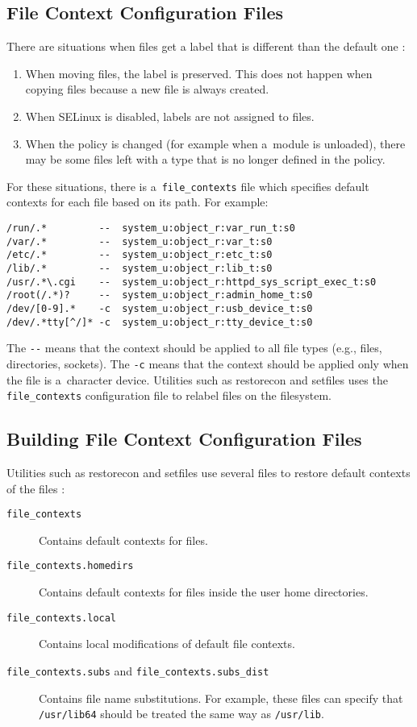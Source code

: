 \subsection{File Context Configuration Files}
There are situations when files get a label that is different than the default
one \cite{selinuxguide}:
\begin{enumerate}
    \item When moving files, the label is preserved. This does not happen when
        copying files because a new file is always created.
    \item When SELinux is disabled, labels are not assigned to files.
    \item When the policy is changed (for example when a~module is unloaded),
        there may be some files left with a type that is no longer defined in
        the policy.
\end{enumerate}
For these situations, there is a~\texttt{file\_contexts} file which specifies
default contexts for each file based on its path. For example:
\begin{lstlisting}
/run/.*         --  system_u:object_r:var_run_t:s0
/var/.*	        --  system_u:object_r:var_t:s0
/etc/.*	        --  system_u:object_r:etc_t:s0
/lib/.*	        --  system_u:object_r:lib_t:s0
/usr/.*\.cgi    --  system_u:object_r:httpd_sys_script_exec_t:s0
/root(/.*)?     --  system_u:object_r:admin_home_t:s0
/dev/[0-9].*    -c  system_u:object_r:usb_device_t:s0
/dev/.*tty[^/]* -c  system_u:object_r:tty_device_t:s0
\end{lstlisting}
The \texttt{-{}-} means that the context should be applied to all file types
(e.g., files, directories, sockets). The \texttt{-c} means that the context
should be applied only when the file is a~character device. Utilities such as
restorecon and setfiles uses the \texttt{file\_contexts} configuration file to
relabel files on the filesystem.

\subsection{Building File Context Configuration Files}
Utilities such as restorecon and setfiles use several files to restore default
contexts of the files \cite[pp.~165--167]{tsn}:
\begin{description}
    \item [\texttt{file\_contexts}] Contains default contexts for files.
    \item [\texttt{file\_contexts.homedirs}] Contains default contexts for files
        inside the user home directories.
    \item [\texttt{file\_contexts.local}] Contains local modifications of
        default file contexts.
    \item [\texttt{file\_contexts.subs} and \texttt{file\_contexts.subs\_dist}]
        Contains file name substitutions. For example, these files can specify
        that \texttt{/usr/lib64} should be treated the same way as
        \texttt{/usr/lib}.
\end{description}

